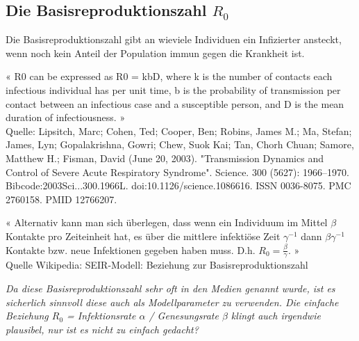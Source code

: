 \documentclass[11pt,a4paper]{article}
\begin{document}
\subsection{Die Basisreproduktionszahl \(R_0\)}
\label{sec:basis}
Die Basisreproduktionszahl gibt an wieviele Individuen ein Infizierter ansteckt, wenn noch kein Anteil der Population immun gegen die Krankheit ist.\\
\begin{mdframed}[backgroundcolor=gray!10,linewidth=0pt]
« R0 can be expressed as R0 = kbD, where k is the number of contacts each infectious individual has per unit time, b is the probability of transmission per contact between an infectious case and a susceptible person, and D is the mean duration of infectiousness. »\\
Quelle: Lipsitch, Marc; Cohen, Ted; Cooper, Ben; Robins, James M.; Ma, Stefan; James, Lyn; Gopalakrishna, Gowri; Chew, Suok Kai; Tan, Chorh Chuan; Samore, Matthew H.; Fisman, David (June 20, 2003). "Transmission Dynamics and Control of Severe Acute Respiratory Syndrome". Science. 300 (5627): 1966–1970. Bibcode:2003Sci...300.1966L. doi:10.1126/science.1086616. ISSN 0036-8075. PMC 2760158. PMID 12766207.
\end{mdframed}
\begin{mdframed}[backgroundcolor=gray!10,linewidth=0pt]
« Alternativ kann man sich überlegen, dass wenn ein Individuum im Mittel \(\beta\) Kontakte pro Zeiteinheit hat, es über die mittlere infektiöse Zeit \(\gamma^{-1}\) dann \(\beta \gamma^{-1}\) Kontakte bzw. neue Infektionen gegeben haben muss. D.h. \(R_0 = \frac{\beta}{\gamma}\). »\\
Quelle Wikipedia: SEIR-Modell: Beziehung zur Basisreproduktionszahl
\end{mdframed}
\textit{Da diese Basisreproduktionszahl sehr oft in den Medien genannt wurde, ist es sicherlich sinnvoll diese auch als Modellparameter zu verwenden. Die einfache Beziehung \(R_0\) = Infektionsrate \(\alpha\) / Genesungsrate \(\beta\) klingt auch irgendwie plausibel, nur ist es nicht zu einfach gedacht?}
\end{document}
